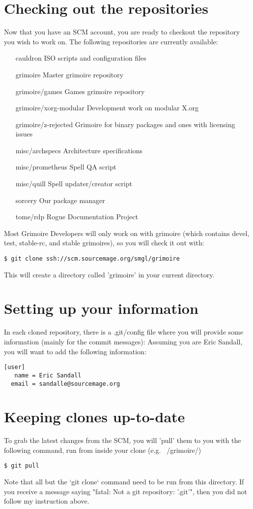 \documentclass[a4paper,10pt]{book}
\begin{document}
\section{Checking out the repositories}
Now that you have an SCM account, you are ready to checkout the repository
you wish to work on. The following repositories are currently available:
\begin{itemize}
\item[cauldron] ISO scripts and configuration files
\item[grimoire] Master grimoire repository
\item[grimoire/games] Games grimoire repository
\item[grimoire/xorg-modular] Development work on modular X.org
\item[grimoire/z-rejected] Grimoire for binary packages and ones with licensing
issues
\item[misc/archspecs] Architecture specifications
\item[misc/prometheus] Spell QA script
\item[misc/quill] Spell updater/creator script
\item[sorcery] Our package manager
\item[tome/rdp] Rogue Documentation Project
\end{itemize}

Most Grimoire Developers will only work on with grimoire (which contains
devel, test, stable-rc, and stable grimoires), so you will check it out
with:
\begin{verbatim}
$ git clone ssh://scm.sourcemage.org/smgl/grimoire
\end{verbatim}

This will create a directory called 'grimoire' in your current directory.

\section{Setting up your information}
In each cloned repository, there is a .git/config file where you will
provide some information (mainly for the commit messages):
Assuming you are Eric Sandall, you will want to add the following
information:

\begin{verbatim}
[user]
   name = Eric Sandall
  email = sandalle@sourcemage.org
\end{verbatim}

\section{Keeping clones up-to-date}
To grab the latest changes from the SCM, you will 'pull' them to you with
the following command, run from inside your clone (e.g. ~/grimoire/)
\begin{verbatim}
$ git pull
\end{verbatim}
Note that all but the `git clone` command need to be run from this
directory.  If you receive a message saying "fatal: Not a git repository:
'.git'", then you did not follow my instruction above.
\end{document}

